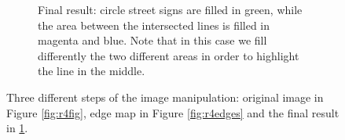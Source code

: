 \documentclass[twoside,onecolumn]{article}
\theoremstyle{definition}
\begin{document}
\begin{figure}
\begin{subfigure}{0.6\textwidth}
\caption{Final result: circle street signs are filled in green, while the area between the intersected lines is filled in magenta and blue. Note that in this case we fill differently the two different areas in order to highlight the line in the middle.}\label{fig:r4circles}
\end{subfigure}\caption{Three different steps of the image manipulation: original image in Figure \ref{fig:r4fig}, edge map in Figure \ref{fig:r4edges} and the final result in \ref{fig:r4circles}. }\label{fig:road4}
\end{figure}
\end{document}
